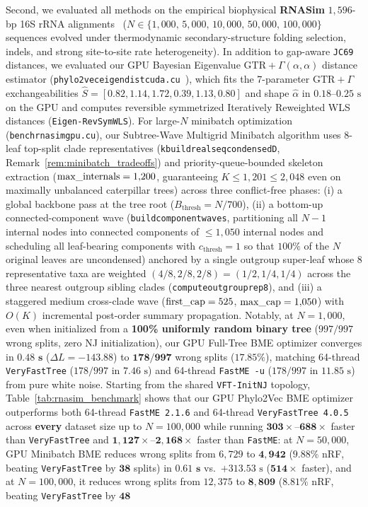 \documentclass[11pt,a4paper]{article}
\makeatletter
\DeclareRobustCommand{\_}{\ifmmode\nfss@text{\textunderscore}\else\textunderscore\allowbreak\fi}
\theoremstyle{definition}
\makeatother
\begin{document}
Second, we evaluated all methods on the empirical biophysical \textbf{RNASim} $1{,}596$-bp 16S rRNA alignments~\cite{mirarab2015pasta} ($N \in \{1{,}000, \, 5{,}000, \, 10{,}000, \, 50{,}000, \, 100{,}000\}$ sequences evolved under thermodynamic secondary-structure folding selection, indels, and strong site-to-site rate heterogeneity). In addition to gap-aware \texttt{JC69} distances, we evaluated our GPU Bayesian Eigenvalue $\text{GTR}+\Gamma(\alpha,\alpha)$ distance estimator (\texttt{phylo2vec\_eigen\_dist\_cuda.cu}~\cite{penn2025eigen}), which fits the 7-parameter $\text{GTR}+\Gamma$ exchangeabilities $\hat{S} = [0.82, 1.14, 1.72, 0.39, 1.13, 0.80]$ and shape $\hat{\alpha}$ in $0.18\text{--}0.25\text{ s}$ on the GPU and computes reversible symmetrized Iteratively Reweighted WLS distances (\texttt{Eigen-RevSymWLS}). For large-$N$ minibatch optimization (\texttt{bench\_rnasim\_gpu.cu}), our Subtree-Wave Multigrid Minibatch algorithm uses 8-leaf top-split clade representatives (\texttt{k\_build\_real\_seq\_condensed\_D}, Remark~\ref{rem:minibatch_tradeoffs}) and priority-queue-bounded skeleton extraction ($\text{max\_internals} = 1{,}200$, guaranteeing $K \le 1{,}201 \le 2{,}048$ even on maximally unbalanced caterpillar trees) across three conflict-free phases: (i) a global backbone pass at the tree root ($B_{\text{thresh}} = N/700$), (ii) a bottom-up connected-component wave (\texttt{build\_component\_waves}, partitioning all $N-1$ internal nodes into connected components of $\le 1{,}050$ internal nodes and scheduling all leaf-bearing components with $c_{\text{thresh}} = 1$ so that $100\%$ of the $N$ original leaves are uncondensed) anchored by a single outgroup super-leaf whose 8 representative taxa are weighted $(4/8, 2/8, 2/8) = (1/2, 1/4, 1/4)$ across the three nearest outgroup sibling clades (\texttt{compute\_outgroup\_rep8}), and (iii) a staggered medium cross-clade wave ($\text{first\_cap} = 525$, $\text{max\_cap} = 1{,}050$) with $O(K)$ incremental post-order summary propagation. Notably, at $N = 1{,}000$, even when initialized from a \textbf{100\% uniformly random binary tree} ($997/997$ wrong splits, zero NJ initialization), our GPU Full-Tree BME optimizer converges in $\mathbf{0.48\text{ s}}$ ($\Delta L = -143.88$) to $\mathbf{178/997}$ wrong splits ($17.85\%$), matching 64-thread \texttt{VeryFastTree} ($178/997$ in $7.46\text{ s}$) and 64-thread \texttt{FastME -u} ($178/997$ in $11.85\text{ s}$) from pure white noise. Starting from the shared \texttt{VFT-InitNJ} topology, Table~\ref{tab:rnasim_benchmark} shows that our GPU Phylo2Vec BME optimizer outperforms both 64-thread \texttt{FastME 2.1.6} and 64-thread \texttt{VeryFastTree 4.0.5} across \textbf{every} dataset size up to $N = 100{,}000$ while running $\mathbf{303\times\text{--}688\times}$ faster than \texttt{VeryFastTree} and $\mathbf{1{,}127\times\text{--}2{,}168\times}$ faster than \texttt{FastME}: at $N = 50{,}000$, GPU Minibatch BME reduces wrong splits from $6{,}729$ to $\mathbf{4{,}942}$ ($\mathbf{9.88\%}$ nRF, beating \texttt{VeryFastTree} by $\mathbf{38}$ splits) in $\mathbf{0.61\text{ s}}$ vs.\ $+313.53\text{ s}$ ($\mathbf{514\times}$ faster), and at $N = 100{,}000$, it reduces wrong splits from $12{,}375$ to $\mathbf{8{,}809}$ ($\mathbf{8.81\%}$ nRF, beating \texttt{VeryFastTree} by $\mathbf{48}$ 
\end{document}
